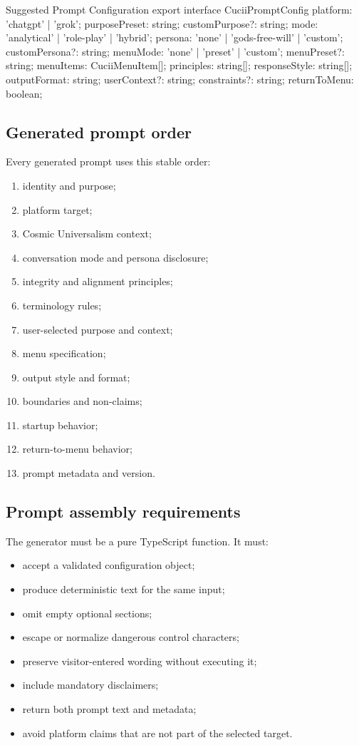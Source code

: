 \documentclass[11pt,letterpaper]{article}
\begin{document}
\begin{codebox}{Suggested Prompt Configuration}
export interface CuciiPromptConfig {
  platform: 'chatgpt' | 'grok';
  purposePreset: string;
  customPurpose?: string;
  mode: 'analytical' | 'role-play' | 'hybrid';
  persona: 'none' | 'gods-free-will' | 'custom';
  customPersona?: string;
  menuMode: 'none' | 'preset' | 'custom';
  menuPreset?: string;
  menuItems: CuciiMenuItem[];
  principles: string[];
  responseStyle: string[];
  outputFormat: string;
  userContext?: string;
  constraints?: string;
  returnToMenu: boolean;
}
\end{codebox}

\subsection{Generated prompt order}

Every generated prompt uses this stable order:

\begin{enumerate}
    \item identity and purpose;
    \item platform target;
    \item Cosmic Universalism context;
    \item conversation mode and persona disclosure;
    \item integrity and alignment principles;
    \item terminology rules;
    \item user-selected purpose and context;
    \item menu specification;
    \item output style and format;
    \item boundaries and non-claims;
    \item startup behavior;
    \item return-to-menu behavior;
    \item prompt metadata and version.
\end{enumerate}

\subsection{Prompt assembly requirements}

The generator must be a pure TypeScript function. It must:

\begin{itemize}
    \item accept a validated configuration object;
    \item produce deterministic text for the same input;
    \item omit empty optional sections;
    \item escape or normalize dangerous control characters;
    \item preserve visitor-entered wording without executing it;
    \item include mandatory disclaimers;
    \item return both prompt text and metadata;
    \item avoid platform claims that are not part of the selected target.
\end{itemize}
\end{document}
